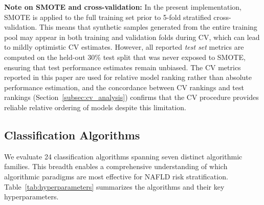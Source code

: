 \documentclass[conference,10pt]{IEEEtran}
\begin{document}
\textbf{Note on SMOTE and cross-validation:} In the present implementation, SMOTE is applied to the full training set prior to 5-fold stratified cross-validation. This means that synthetic samples generated from the entire training pool may appear in both training and validation folds during CV, which can lead to mildly optimistic CV estimates. However, all reported \textit{test set} metrics are computed on the held-out 30\% test split that was never exposed to SMOTE, ensuring that test performance estimates remain unbiased. The CV metrics reported in this paper are used for relative model ranking rather than absolute performance estimation, and the concordance between CV rankings and test rankings (Section~\ref{subsec:cv_analysis}) confirms that the CV procedure provides reliable relative ordering of models despite this limitation.

\subsection{Classification Algorithms}
\label{subsec:models}

We evaluate 24 classification algorithms spanning seven distinct algorithmic families. This breadth enables a comprehensive understanding of which algorithmic paradigms are most effective for NAFLD risk stratification. Table~\ref{tab:hyperparameters} summarizes the algorithms and their key hyperparameters.
\end{document}
